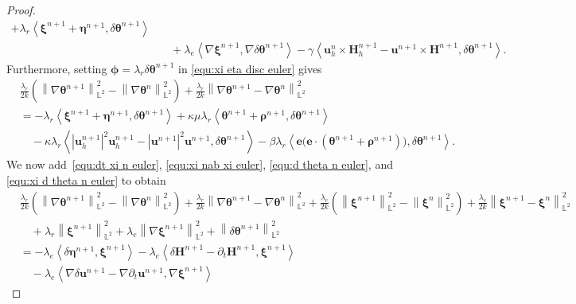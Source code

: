 \documentclass[11pt, reqno]{amsart}
\theoremstyle{definition}
\theoremstyle{remark}
\numberwithin{equation}{section}
\newcommand{\bff}{\boldsymbol}
\newcommand{\bb}{\mathbb}
\newcommand{\norm}[2]{\left\|{#1}\right\|_{#2}}
\newcommand{\inpro}[2]{\left\langle#1,#2\right\rangle}
\newcommand{\abs}[1]{\left|{#1}\right|}
\begin{document}
\begin{proof}
\begin{align}
		+
		\lambda_r \inpro{\bff{\xi}^{n+1}+\bff{\eta}^{n+1}}{\delta \bff{\theta}^{n+1}}
		\\
		&\quad
		+
		\lambda_e \inpro{\nabla \bff{\xi}^{n+1}}{\nabla \delta \bff{\theta}^{n+1}}
		-
		\gamma \inpro{\bff{u}_h^n\times \bff{H}_h^{n+1}- \bff{u}^{n+1}\times \bff{H}^{n+1}}{\delta\bff{\theta}^{n+1}}.
	\end{align}
	Furthermore, setting $\bff{\phi}=\lambda_r \delta \bff{\theta}^{n+1}$ in \eqref{equ:xi eta disc euler} gives
	\begin{align}\label{equ:xi d theta n euler}
		\nonumber
		&\frac{\lambda_r}{2k} \left(\norm{\nabla \bff{\theta}^{n+1}}{\bb{L}^2}^2 -\norm{\nabla \bff{\theta}^n}{\bb{L}^2}^2\right)
		+
		\frac{\lambda_r}{2k} \norm{\nabla \bff{\theta}^{n+1}-\nabla \bff{\theta}^n}{\bb{L}^2}^2
		\\
		\nonumber
		&=
		-\lambda_r \inpro{\bff{\xi}^{n+1}+\bff{\eta}^{n+1}}{\delta \bff{\theta}^{n+1}}
		+
		\kappa\mu\lambda_r \inpro{\bff{\theta}^{n+1}+\bff{\rho}^{n+1}}{\delta \bff{\theta}^{n+1}}
		\\
		&\quad
		-
		\kappa\lambda_r \inpro{\abs{\bff{u}_h^{n+1}}^2 \bff{u}_h^{n+1}- \abs{\bff{u}^{n+1}}^2 \bff{u}^{n+1}}{\delta \bff{\theta}^{n+1}}
		-
		\beta\lambda_r \inpro{\bff{e}\big(\bff{e}\cdot (\bff{\theta}^{n+1}+\bff{\rho}^{n+1})\big)}{\delta \bff{\theta}^{n+1}}.
	\end{align}
	We now add~\eqref{equ:dt xi n euler}, \eqref{equ:xi nab xi euler}, \eqref{equ:d theta n euler}, and \eqref{equ:xi d theta n euler} to obtain
	\begin{align}\label{equ:I1 to I13 euler}
		\nonumber
		&\frac{\lambda_r}{2k} \left(\norm{\nabla \bff{\theta}^{n+1}}{\bb{L}^2}^2 -\norm{\nabla \bff{\theta}^n}{\bb{L}^2}^2\right)
		+
		\frac{\lambda_r}{2k} \norm{\nabla \bff{\theta}^{n+1}-\nabla \bff{\theta}^n}{\bb{L}^2}^2
		+
		\frac{\lambda_e}{2k} \left(\norm{\bff{\xi}^{n+1}}{\bb{L}^2}^2-\norm{\bff{\xi}^n}{\bb{L}^2}^2\right)
		+
		\frac{\lambda_e}{2k} \norm{\bff{\xi}^{n+1}-\bff{\xi}^n}{\bb{L}^2}^2
		\\
		\nonumber
		&\quad
		+
		\lambda_r \norm{\bff{\xi}^{n+1}}{\bb{L}^2}^2
		+
		\lambda_e \norm{\nabla \bff{\xi}^{n+1}}{\bb{L}^2}^2
		+
		\norm{\delta \bff{\theta}^{n+1}}{\bb{L}^2}^2
		\\
		\nonumber
		&=
		-\lambda_e \inpro{\delta \bff{\eta}^{n+1}}{\bff{\xi}^{n+1}}
		-
		\lambda_e \inpro{\delta\bff{H}^{n+1}-\partial_t \bff{H}^{n+1}}{\bff{\xi}^{n+1}}
		\\
		\nonumber
		&\quad
		-
		\lambda_e \inpro{\nabla \delta \bff{u}^{n+1}-\nabla \partial_t \bff{u}^{n+1}}{\nabla \bff{\xi}^{n+1}}

\end{align}
\end{proof}
\end{document}
